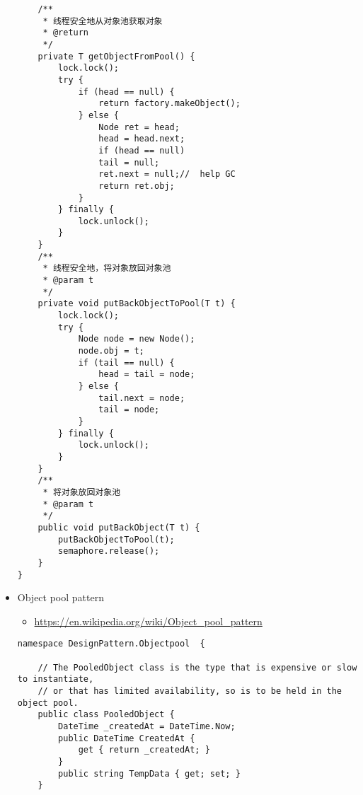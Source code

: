 \documentclass[9pt, b5paper]{article}
\begin{document}
\begin{itemize}
\begin{verbatim}
    /** 
     * 线程安全地从对象池获取对象 
     * @return 
     */  
    private T getObjectFromPool() {  
        lock.lock();  
        try {  
            if (head == null) {  
                return factory.makeObject();  
            } else {  
                Node ret = head;  
                head = head.next;  
                if (head == null)  
                tail = null;  
                ret.next = null;//  help GC  
                return ret.obj;  
            }  
        } finally {  
            lock.unlock();  
        }  
    }  
    /** 
     * 线程安全地，将对象放回对象池 
     * @param t 
     */  
    private void putBackObjectToPool(T t) {  
        lock.lock();  
        try {  
            Node node = new Node();  
            node.obj = t;  
            if (tail == null) {  
                head = tail = node;  
            } else {  
                tail.next = node;  
                tail = node;  
            }  
        } finally {  
            lock.unlock();  
        }  
    }  
    /** 
     * 将对象放回对象池 
     * @param t 
     */  
    public void putBackObject(T t) {  
        putBackObjectToPool(t);  
        semaphore.release();  
    }  
}
\end{verbatim}
\item Object pool pattern
\begin{itemize}
\item \url{https://en.wikipedia.org/wiki/Object_pool_pattern}
\end{itemize}
\begin{verbatim}
namespace DesignPattern.Objectpool  {

    // The PooledObject class is the type that is expensive or slow to instantiate,
    // or that has limited availability, so is to be held in the object pool.
    public class PooledObject {
        DateTime _createdAt = DateTime.Now;
        public DateTime CreatedAt {
            get { return _createdAt; }
        }
        public string TempData { get; set; }
    }


\end{verbatim}
\end{itemize}
\end{document}

